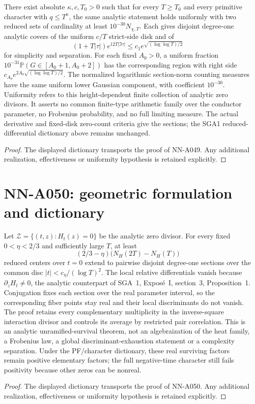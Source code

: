 \begin{geometricstatement}[NN-A049]
There exist absolute $\kappa,c,T_0>0$ such that for every $T\ge T_0$ and every primitive character with $q\le T^\kappa$, the same analytic statement holds uniformly with two reduced sets of cardinality at least $10^{-30}N_{\chi,T}$. Each gives disjoint degree-one analytic covers of the uniform $c/T$ strict-side disk and of
\[
 (1+T|\tau|)e^{12T|\Im\tau|}
       \le c_1e^{\sqrt{(\log\log T)/2}}
\]
for simplicity and separation. For each fixed $A_0>0$, a uniform fraction $10^{-31}\mathbb P(G\in[A_0+1,A_0+2])$ has the corresponding region with right side $c_{A_0}e^{2A_0\sqrt{(\log\log T)/2}}$. The normalized logarithmic section-norm counting measures have the same uniform lower Gaussian component, with coefficient $10^{-30}$. Uniformity refers to this height-dependent finite collection of analytic zero divisors. It asserts no common finite-type arithmetic family over the conductor parameter, no Frobenius probability, and no full limiting measure. The actual derivative and fixed-disk zero-count criteria give the sections; the SGA1 reduced-differential dictionary above remains unchanged.

\end{geometricstatement}
\begin{proof} The displayed dictionary transports the proof of NN-A049. Any additional realization, effectiveness or uniformity hypothesis is retained explicitly.\end{proof}


\section{NN-A050: geometric formulation and dictionary}
\begin{geometricstatement}[NN-A050]
Let $\mathcal Z=\{(t,z):H_t(z)=0\}$ be the analytic zero divisor. For every fixed $0<\eta<2/3$ and sufficiently large $T$, at least \[(2/3-\eta)\bigl(N_H(2T)-N_H(T)\bigr)\] reduced centers over $t=0$ extend to pairwise disjoint degree-one sections over the common disc $|t|<c_\eta/(\log T)^2$. The local relative differentials vanish because $\partial_zH_t\ne0$, the analytic counterpart of SGA~1, Expos\'e~I, section~3, Proposition~1. Conjugation fixes each section over the real parameter interval, so the corresponding fiber points stay real and their local discriminants do not vanish. The proof retains every complementary multiplicity in the inverse-square interaction divisor and controls its average by restricted pair correlation. This is an analytic unramified-survival theorem, not an algebraization of the heat family, a Frobenius law, a global discriminant-exhaustion statement or a complexity separation. Under the PF/character dictionary, these real surviving factors remain positive elementary factors; the full negative-time character still fails positivity because other zeros can be nonreal.
\end{geometricstatement}
\begin{proof} The displayed dictionary transports the proof of NN-A050. Any additional realization, effectiveness or uniformity hypothesis is retained explicitly.\end{proof}


